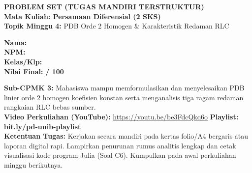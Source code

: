 \documentclass[10pt,a4paper]{article}
\begin{document}
\noindent\begin{minipage}[c]{0.68\textwidth}%
  {\large\textbf{\color{unibblue}PROBLEM SET (TUGAS MANDIRI TERSTRUKTUR)}}\\[1mm]
  {\normalsize\textbf{Mata Kuliah: Persamaan Diferensial (2 SKS)}}\\[0.5mm]
  {\small\textbf{Topik Minggu 4:} PDB Orde 2 Homogen \& Karakteristik Redaman RLC}%
\end{minipage}%
\hfill%
\begin{minipage}[c]{0.30\textwidth}%
  \begin{tcolorbox}[colback=unibblue!5,colframe=unibblue,boxrule=0.6pt,arc=2pt,left=4pt,right=4pt,top=2pt,bottom=2pt]
    \scriptsize
    \textbf{Nama:} \dotfill\\[1.2mm]
    \textbf{NPM:} \dotfill\\[1.2mm]
    \textbf{Kelas/Klp:} \dotfill\\[1.2mm]
    \textbf{Nilai Final:} \hfill \textbf{/ 100}
  \end{tcolorbox}%
\end{minipage}\par

\vspace{1.5mm}

\begin{tcolorbox}[colback=boxbg,colframe=unibgold!90!black,boxrule=0.6pt,arc=2pt,left=5pt,right=5pt,top=3pt,bottom=3pt,title=\textbf{\scriptsize Capaian Pembelajaran (Sub-CPMK 3) \& Pedoman Pengerjaan Tugas}]
  \scriptsize
  \textbf{Sub-CPMK 3:} Mahasiswa mampu memformulasikan dan menyelesaikan PDB linier orde 2 homogen koefisien konstan serta menganalisis tiga ragam redaman rangkaian RLC bebas sumber.\\
  \textbf{Video Perkuliahan (YouTube):} \url{https://youtu.be/be3FdcQkq6o} \hfill \textbf{Playlist:} \href{https://www.youtube.com/playlist?list=PLS5oOZWXZeTw}{\color{unibblue}\textbf{bit.ly/pd-unib-playlist}}\\\textbf{Ketentuan Tugas:} Kerjakan secara mandiri pada kertas folio/A4 bergaris atau laporan digital rapi. Lampirkan penurunan rumus analitis lengkap dan cetak visualisasi kode program Julia (Soal C6). Kumpulkan pada awal perkuliahan minggu berikutnya.
\end{tcolorbox}

\vspace{1.5mm}

\par
\vspace{1mm}
\end{document}

